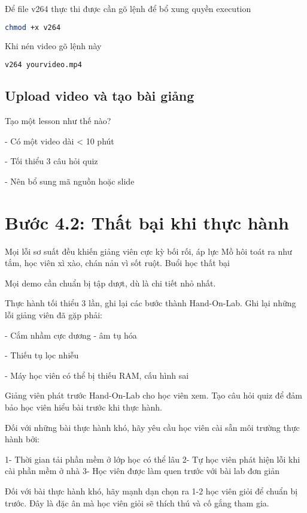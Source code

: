 Để file v264 thực thi được cần gõ lệnh để bổ xung quyền execution

\begin{lstlisting}[language=bash]
  chmod +x v264
\end{lstlisting}

Khi nén video gõ lệnh này

\begin{lstlisting}[language=bash]
  v264 yourvideo.mp4
\end{lstlisting}

\subsection{Upload video và tạo bài giảng}

Tạo một lesson như thế nào?

- Có một video dài < 10 phút

- Tối thiểu 3 câu hỏi quiz

- Nên bổ sung mã nguồn hoặc slide

\section{Bước 4.2: Thất bại khi thực hành}

Mọi lỗi sơ suất đều khiến giảng viên cực kỳ bối rối, áp lực
Mồ hôi toát ra như tắm, học viên xì xào, chán nản vì sốt ruột. Buổi học thất bại

Mọi demo cần chuẩn bị tập dượt, dù là chi tiết nhỏ nhất.

Thực hành tối thiểu 3 lần, ghi lại các bước thành Hand-On-Lab.
Ghi lại những lỗi giảng viên đã gặp phải:

- Cắm nhầm cực dương - âm tụ hóa

- Thiếu tụ lọc nhiễu

- Máy học viên có thể bị thiếu RAM, cấu hình sai

Giảng viên phát trước Hand-On-Lab cho học viên xem. Tạo câu hỏi quiz để đảm bảo học viên hiểu bài trước khi thực hành.

Đối với những bài thực hành khó, hãy yêu cầu học viên cài sẵn môi trường thực hành bởi:

1- Thời gian tải phần mềm ở lớp học có thể lâu
2- Tự học viên phát hiện lỗi khi cài phần mềm ở nhà
3- Học viên được làm quen trước với bài lab đơn giản

Đối với bài thực hành khó, hãy mạnh dạn chọn ra 1-2 học viên giỏi để chuẩn bị trước. Đây là đặc ân mà học viên giỏi sẽ thích thú và cố gắng tham gia.

